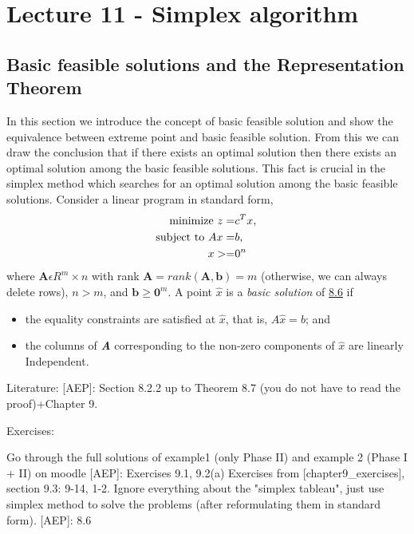 \documentclass[11pt,oneside,a4paper,openright]{article}
\begin{document}
\section*{Lecture 11 - Simplex algorithm}
\subsection*{Basic feasible solutions and the Representation Theorem}
In this section we introduce the concept of basic feasible solution and show the equivalence between extreme point and basic feasible solution. From this we can draw the conclusion that if there exists an optimal solution then there exists
 an optimal solution among the basic feasible solutions. This fact is crucial in the simplex method which searches for an optimal solution among the basic feasible solutions.
\newline
Consider a linear program in standard form,
\begin{equation}
    \begin{align*}
         \text{minimize } z=&c^T x,\text{\newline} \\
         \text{subject to } Ax=&b,\\
         x>=&0^n    
    \end{align*}
    \label{8.6}
\end{equation}
where $\textbf{A} \epsilon R^m\times n$ with rank $\textbf{A}=rank(\textbf{A},\textbf{b})=m$ (otherwise, we can always delete rows),
$n>m$, and $\textbf{b} \geq \textbf{0}^m$. A point $\hat{x}$ is a \emph{basic solution} of \href{8.6}{8.6} if \newline
\begin{itemize}
    \item the equality constraints are satisfied at $\hat{x}$, that is, $A\hat{x}=b$; and
    \item the columns of \emph{\textbf{A}} corresponding to the non-zero components of $\hat{x}$ are linearly Independent.
\end{itemize}

Literature: [AEP]: Section 8.2.2 up to Theorem 8.7 (you do not have to read the proof)+Chapter 9.

Exercises:

Go through the full solutions of example1 (only Phase II) and example 2 (Phase I + II) on moodle
[AEP]: Exercises 9.1, 9.2(a)
Exercises from [chapter9_exercises], section 9.3: 9-14, 1-2.  Ignore everything about the "simplex tableau", just use simplex method to solve the problems (after reformulating them in standard form).
[AEP]: 8.6
\end{document}

